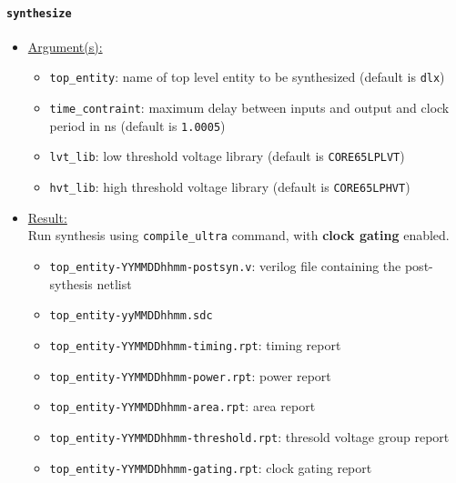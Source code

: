 \paragraph{\texttt{synthesize}}
\begin{itemize}
	\item \underline{Argument(s):}
		\begin{itemize}
			\item \texttt{top\_entity}: name of top level entity to
				be synthesized (default is \texttt{dlx})
			\item \texttt{time\_contraint}: maximum delay between
				inputs and output and clock period in ns
				(default is \texttt{1.0005})
			\item \texttt{lvt\_lib}: low threshold voltage library
				(default is \texttt{CORE65LPLVT})
			\item \texttt{hvt\_lib}: high threshold voltage library
				(default is \texttt{CORE65LPHVT})
		\end{itemize}
	\item \underline{Result:} \\
		Run synthesis using \texttt{compile\_ultra} command, with
		\textbf{clock gating} enabled.
		\begin{itemize}
			\item \texttt{top\_entity-YYMMDDhhmm-postsyn.v}: verilog
				file containing the post-sythesis netlist
			\item \texttt{top\_entity-yyMMDDhhmm.sdc}
			\item \texttt{top\_entity-YYMMDDhhmm-timing.rpt}: timing
				report
			\item \texttt{top\_entity-YYMMDDhhmm-power.rpt}: power
				report
			\item \texttt{top\_entity-YYMMDDhhmm-area.rpt}: area
				report
			\item \texttt{top\_entity-YYMMDDhhmm-threshold.rpt}:
				thresold voltage group report
			\item \texttt{top\_entity-YYMMDDhhmm-gating.rpt}: clock
				gating report
		\end{itemize}
\end{itemize}

